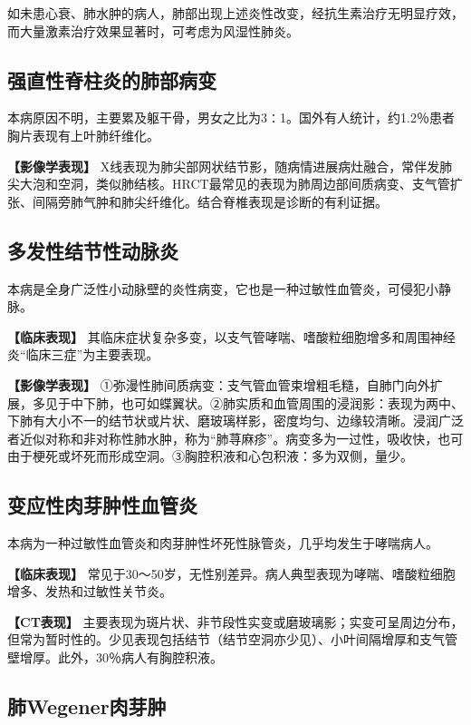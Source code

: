 如未患心衰、肺水肿的病人，肺部出现上述炎性改变，经抗生素治疗无明显疗效，而大量激素治疗效果显著时，可考虑为风湿性肺炎。

\subsection{强直性脊柱炎的肺部病变}

本病原因不明，主要累及躯干骨，男女之比为3∶1。国外有人统计，约1.2％患者胸片表现有上叶肺纤维化。

\textbf{【影像学表现】}
X线表现为肺尖部网状结节影，随病情进展病灶融合，常伴发肺尖大泡和空洞，类似肺结核。HRCT最常见的表现为肺周边部间质病变、支气管扩张、间隔旁肺气肿和肺尖纤维化。结合脊椎表现是诊断的有利证据。

\subsection{多发性结节性动脉炎}

本病是全身广泛性小动脉壁的炎性病变，它也是一种过敏性血管炎，可侵犯小静脉。

\textbf{【临床表现】}
其临床症状复杂多变，以支气管哮喘、嗜酸粒细胞增多和周围神经炎“临床三症”为主要表现。

\textbf{【影像学表现】}
①弥漫性肺间质病变：支气管血管束增粗毛糙，自肺门向外扩展，多见于中下肺，也可如蝶翼状。②肺实质和血管周围的浸润影：表现为两中、下肺有大小不一的结节状或片状、磨玻璃样影，密度均匀、边缘较清晰。浸润广泛者近似对称和非对称性肺水肿，称为“肺荨麻疹”。病变多为一过性，吸收快，也可由于梗死或坏死而形成空洞。③胸腔积液和心包积液：多为双侧，量少。

\subsection{变应性肉芽肿性血管炎}

本病为一种过敏性血管炎和肉芽肿性坏死性脉管炎，几乎均发生于哮喘病人。

\textbf{【临床表现】}
常见于30～50岁，无性别差异。病人典型表现为哮喘、嗜酸粒细胞增多、发热和过敏性关节炎。

\textbf{【CT表现】}
主要表现为斑片状、非节段性实变或磨玻璃影；实变可呈周边分布，但常为暂时性的。少见表现包括结节（结节空洞亦少见）、小叶间隔增厚和支气管壁增厚。此外，30％病人有胸腔积液。

\subsection{肺Wegener肉芽肿}

